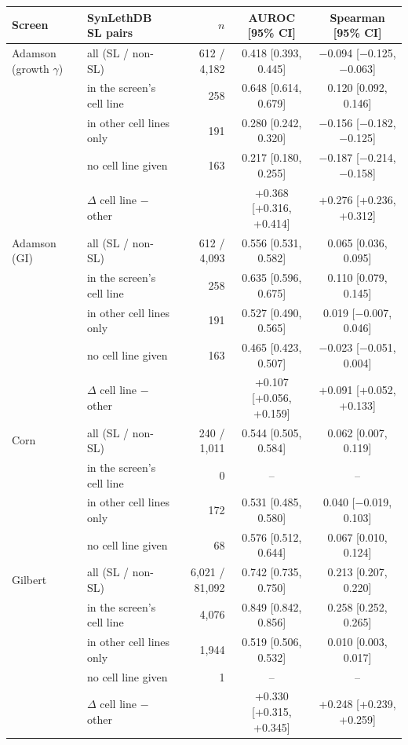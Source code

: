 \begin{table}[t]
\centering
\small
\begin{tabular}{ll|rcc}
\hline
Screen & SynLethDB SL pairs & $n$ & AUROC [95\% CI] & Spearman [95\% CI] \\
\hline
Adamson (growth $\gamma$) & all (SL / non-SL) & 612 / 4,182 & 0.418 [0.393, 0.445] & $-$0.094 [$-$0.125, $-$0.063] \\
 & in the screen's cell line & 258 & 0.648 [0.614, 0.679] & 0.120 [0.092, 0.146] \\
 & in other cell lines only & 191 & 0.280 [0.242, 0.320] & $-$0.156 [$-$0.182, $-$0.125] \\
 & no cell line given & 163 & 0.217 [0.180, 0.255] & $-$0.187 [$-$0.214, $-$0.158] \\
 & $\Delta$ cell line $-$ other & & +0.368 [+0.316, +0.414] & +0.276 [+0.236, +0.312] \\
\hline
Adamson (GI) & all (SL / non-SL) & 612 / 4,093 & 0.556 [0.531, 0.582] & 0.065 [0.036, 0.095] \\
 & in the screen's cell line & 258 & 0.635 [0.596, 0.675] & 0.110 [0.079, 0.145] \\
 & in other cell lines only & 191 & 0.527 [0.490, 0.565] & 0.019 [$-$0.007, 0.046] \\
 & no cell line given & 163 & 0.465 [0.423, 0.507] & $-$0.023 [$-$0.051, 0.004] \\
 & $\Delta$ cell line $-$ other & & +0.107 [+0.056, +0.159] & +0.091 [+0.052, +0.133] \\
\hline
Corn & all (SL / non-SL) & 240 / 1,011 & 0.544 [0.505, 0.584] & 0.062 [0.007, 0.119] \\
 & in the screen's cell line & 0 & -- & -- \\
 & in other cell lines only & 172 & 0.531 [0.485, 0.580] & 0.040 [$-$0.019, 0.103] \\
 & no cell line given & 68 & 0.576 [0.512, 0.644] & 0.067 [0.010, 0.124] \\
\hline
Gilbert & all (SL / non-SL) & 6,021 / 81,092 & 0.742 [0.735, 0.750] & 0.213 [0.207, 0.220] \\
 & in the screen's cell line & 4,076 & 0.849 [0.842, 0.856] & 0.258 [0.252, 0.265] \\
 & in other cell lines only & 1,944 & 0.519 [0.506, 0.532] & 0.010 [0.003, 0.017] \\
 & no cell line given & 1 & -- & -- \\
 & $\Delta$ cell line $-$ other & & +0.330 [+0.315, +0.345] & +0.248 [+0.239, +0.259] \\

\end{tabular}
\end{table}
